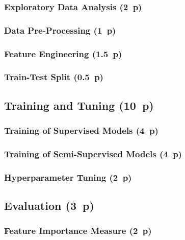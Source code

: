 \subsubsection{Exploratory Data Analysis (2~p)}\label{sec:exploratory-data-analysis}

\subsubsection{Data Pre-Processing (1~p)}\label{sec:data-preprocessing}

\subsubsection{Feature Engineering (1.5~p)}\label{sec:feature-engineering}

\subsubsection{Train-Test Split (0.5~p)}\label{sec:train-test-split}

\subsection{Training and Tuning (10~p)}\label{sec:training-and-tuning}

\subsubsection{Training of Supervised
  Models (4~p)}\label{sec:training-of-supervised-models}


\subsubsection{Training of Semi-Supervised
  Models (4~p)}\label{sec:training-of-semi-supervised-models}


\subsubsection{Hyperparameter Tuning (2~p)}\label{sec:hyperparameter-tuning}


\subsection{Evaluation (3~p)}\label{sec:evaluation}

\subsubsection{Feature Importance
  Measure (2~p)}\label{sec:feature-importance-measure}


